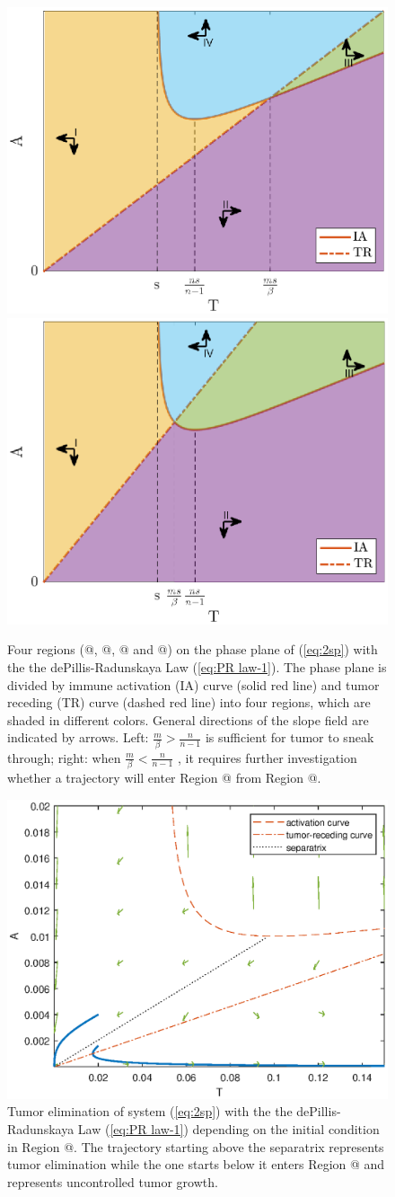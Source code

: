 \documentclass[review,authoryear]{elsarticle}
\makeatletter
\newcommand*{\rom}[1]{\expandafter\@slowromancap\romannumeral #1@}
\makeatother
\begin{document}
\begin{figure}
\centerline{\includegraphics[width=0.5\linewidth]{figs/dP-colored-regions-l}\includegraphics[width=0.5\linewidth]{figs/dP-colored-regions-r}}

\caption{\label{fig:dP-PP-4regions}
Four regions (\rom{1}, \rom{2}, \rom{3} and \rom{4}) on the phase plane of (\ref{eq:2sp}) with the the dePillis-Radunskaya Law (\ref{eq:PR law-1}). The phase plane is divided by immune activation (IA) curve (solid red line) and tumor receding (TR) curve (dashed red line) into four regions, which are 
shaded in different colors. General directions of the slope field
are indicated by arrows. Left: $\frac{m}{\beta}>\frac{n}{n-1}$
is sufficient for tumor to sneak through; right: when $\frac{m}{\beta}<\frac{n}{n-1}$
, it requires further investigation whether a trajectory will enter
Region \rom{3} from Region \rom{2}. }
\end{figure}

\begin{figure}
\centerline{\includegraphics[width=0.7\linewidth]{figs/dP-PP-sep}}

\caption{\label{fig:dP-PP-sep}Tumor elimination of system (\ref{eq:2sp}) with the the dePillis-Radunskaya Law (\ref{eq:PR law-1}) depending on the initial condition
in Region \rom{1}. The trajectory starting above the separatrix represents tumor
elimination while the one starts below it enters Region \rom{2} and represents
uncontrolled tumor growth. }
\end{figure}
\end{document}
